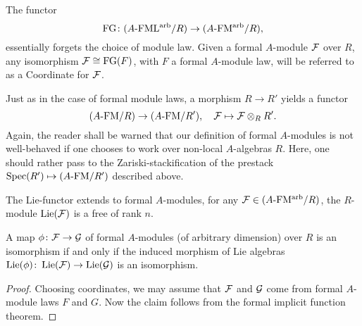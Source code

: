 \documentclass[../main.tex]{subfiles}
\begin{document}

The functor
\begin{equation*}
  \textnormal{FG}\colon  {({A}\textnormal-\allowbreak\mathrm{FML^{arb}}/{R})} \to {({A}\textnormal-\allowbreak\mathrm{FM^{arb}}/{R})},
\end{equation*}
essentially forgets the choice of module law. Given a formal $A$-module
$\mathcal{F}$ over $R$, any isomorphism $\mathcal{F} \cong \textnormal{FG}(F)$, with $F$ a formal $A$-module
law, will be referred to as a Coordinate for $\mathcal{F}$.

Just as in the case of formal 
module laws, a morphism $R \to R'$ yields a functor 
\begin{equation*} 
  {({A}\textnormal-\allowbreak\mathrm{FM}/{R})} \to {({A}\textnormal-\allowbreak\mathrm{FM}/{R'})}, \quad \mathcal{F} \mapsto \mathcal{F} \otimes_R R'.
\end{equation*}
Again, the reader shall be warned that our definition of formal 
$A$-modules is not well-behaved if one chooses to work over non-local
$A$-algebras $R$. Here, one should rather pass to the Zariski-stackification
of the prestack $\operatorname{Spec}(R') \mapsto {({A}\textnormal-\allowbreak\mathrm{FM}/{R'})}$ described above.

The Lie-functor extends to formal $A$-modules, for any $\mathcal{F} \in {({A}\textnormal-\allowbreak\mathrm{FM^{arb}}/{R})}$,
the $R$-module $\operatorname{Lie}(\mathcal{F})$ is a free of rank $n$.
\begin{lem}\label{lem:IsosCheckOnLie}
  A map $\phi\colon  \mathcal{F} \to \mathcal{G}$ of formal $A$-modules (of arbitrary
  dimension) over $R$ is an isomorphism if and only if the induced morphism of
  Lie algebras $\operatorname{Lie}(\phi)\colon  \operatorname{Lie}(\mathcal{F}) \to \operatorname{Lie}(\mathcal{G})$ is an isomorphism.
\begin{proof}
  Choosing coordinates, we may assume that $\mathcal{F}$ and $\mathcal{G}$ come from formal $A$-module
  laws $F$ and $G$. Now the claim follows from the formal implicit
  function theorem.
\end{proof}
\end{lem}
\end{document}
